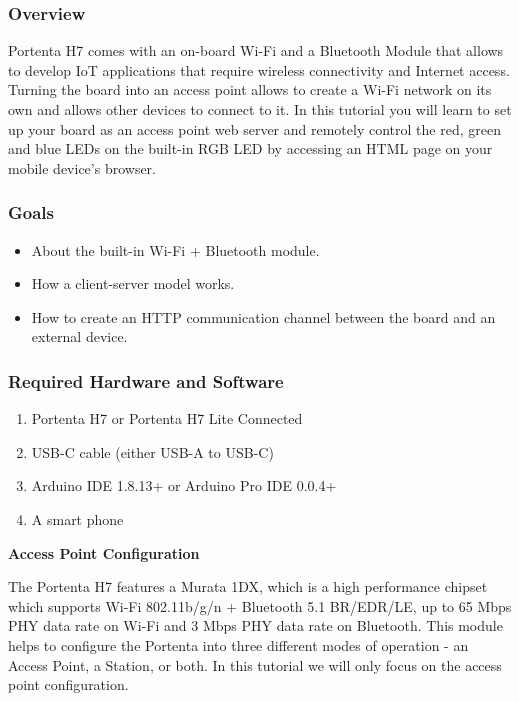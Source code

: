 \subsubsection{Overview}
Portenta H7 comes with an on-board Wi-Fi and a Bluetooth Module that allows to develop IoT applications that require wireless connectivity and Internet access. Turning the board into an access point allows to create a Wi-Fi network on its own and allows other devices to connect to it. In this tutorial you will learn to set up your board as an access point web server and remotely control the red, green and blue LEDs on the built-in RGB LED by accessing an HTML page on your mobile device’s browser. \cite{portentaWifiAccessPoint:2024}

\subsubsection{Goals}
\begin{itemize}
	\item About the built-in Wi-Fi + Bluetooth module.
	\item How a client-server model works. \cite{portentaWifiAccessPoint:2024}
	\item How to create an HTTP communication channel between the board and an external device. \cite{portentaWifiAccessPoint:2024}
\end{itemize}

\subsubsection {Required Hardware and Software}
\begin{enumerate}
	\item Portenta H7 or Portenta H7 Lite Connected 
	\item USB-C cable (either USB-A to USB-C)
	\item Arduino IDE 1.8.13+ or Arduino Pro IDE 0.0.4+
	\item A smart phone \cite{portentaWifiAccessPoint:2024}
\end{enumerate}

\textbf{Access Point Configuration}  \newline

The Portenta H7 features a Murata 1DX, which is a high performance chipset which supports Wi-Fi 802.11b/g/n + Bluetooth 5.1 BR/EDR/LE, up to 65 Mbps PHY data rate on Wi-Fi and 3 Mbps PHY data rate on Bluetooth. This module helps to configure the Portenta into three different modes of operation - an Access Point, a Station, or both. In this tutorial we will only focus on the access point configuration.

